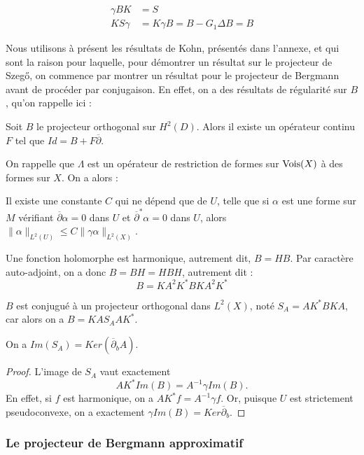 \begin{align*}
  \gamma B K &= S\\
  K S \gamma &= K\gamma B = B-G_1\Delta B = B
\end{align*}

Nous utilisons à présent les résultats de Kohn, présentés dans l'annexe, et qui sont la raison pour laquelle, pour démontrer un résultat sur le projecteur de Szeg\H{o}, on commence par montrer un résultat pour le projecteur de Bergmann avant de procéder par conjugaison. En effet, on a des résultats de régularité sur $B$, qu'on rappelle ici :
\begin{prop}
Soit $B$ le projecteur orthogonal sur $H^2(D)$. Alors il existe un opérateur continu $F$ tel que $Id = B + F\overline{\partial}$.
\end{prop}
On rappelle que $\Lambda$ est un opérateur de restriction de formes sur $\operatorname{Vois}(X)$ à des formes sur $X$. On a alors :
\begin{prop}
Il existe une constante $C$ qui ne dépend que de $U$, telle que si $\alpha$ est une forme sur $M$ vérifiant $\overline{\partial}\alpha=0$ dans $U$ et $\overline{\partial}^{*}\alpha=0$ dans $U$, alors $\|\alpha\|_{L^2(U)} \leq C\|\gamma\alpha\|_{L^2(X)}$.
\end{prop}

Une fonction holomorphe est harmonique, autrement dit, $B=HB$. Par caractère auto-adjoint, on a donc $B=BH=HBH$, autrement dit :
\begin{equation*}
  B=KA^2K^*BKA^2K^*
\end{equation*}

$B$ est conjugué à un projecteur orthogonal dans $L^2(X)$, noté $S_A = AK^*BKA$, car alors on a $B=KAS_AAK^*$.

\begin{lem}
On a $Im(S_A) = Ker(\overline{\partial}_bA)$.
\end{lem}
\begin{proof}
 L'image de $S_A$ vaut exactement 
 \begin{equation*}
 AK^*Im(B) = A^{-1}\gamma Im(B).
 \end{equation*}
 \noindent En effet, si $f$ est harmonique, on a $AK^*f=A^{-1}\gamma f$. Or, puisque $U$ est strictement pseudoconvexe, on a exactement $\gamma Im(B) = Ker \overline{\partial}_b$.
 \end{proof}
 
\subsubsection{Le projecteur de Bergmann approximatif}
 
